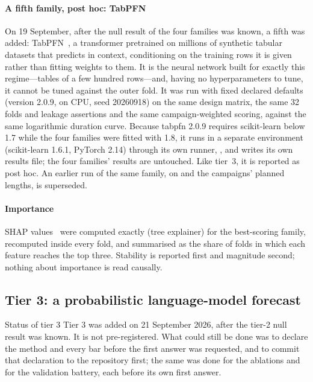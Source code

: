\paragraph{A fifth family, post hoc: TabPFN} On 19 September, after the null result of the four families was
known, a fifth was added: TabPFN~\citep{hollmann2025}, a transformer pretrained on millions of synthetic tabular
datasets that predicts in context, conditioning on the training rows it is given rather than fitting weights to
them. It is the neural network built for exactly this regime---tables of a few hundred rows---and, having no
hyperparameters to tune, it cannot be tuned against the outer fold. It was run with fixed declared defaults (version
2.0.9, on CPU, seed 20260918) on the same design matrix, the same 32 folds and leakage assertions and the same
campaign-weighted scoring, against the same logarithmic duration curve. Because tabpfn 2.0.9 requires scikit-learn
below 1.7 while the four families were fitted with 1.8, it runs in a separate environment (scikit-learn 1.6.1,
PyTorch 2.14) through its own runner, , and writes its own results file; the four
families' results are untouched. Like tier~3, it is reported as post hoc. An earlier run of the same family, on
 and the campaigns' planned lengths, is superseded.

\paragraph{Importance} SHAP values~\citep{lundberg2017} were computed exactly (tree explainer) for the best-scoring
family, recomputed inside every fold, and summarised as the share of folds in which each feature reaches the top
three. Stability is reported first and magnitude second; nothing about importance is read causally.

\subsection{Tier 3: a probabilistic language-model forecast}
\label{sec:tier3}

\begin{keybox}{Status of tier 3}
Tier 3 was added on 21 September 2026, after the tier-2 null result was known. It is not pre-registered. What could
still be done was to declare the method and every bar before the first answer was requested, and to commit that
declaration to the repository first; the same was done for the ablations and for the validation battery, each
before its own first answer.
\end{keybox}


